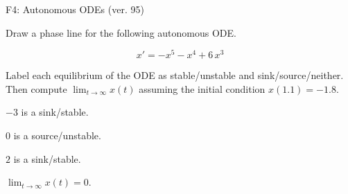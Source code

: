 \begin{exercise}
  \begin{exerciseTitle}F4: Autonomous ODEs (ver. 95)\end{exerciseTitle}
  \begin{exerciseStatement}
    

      Draw a phase line for the following 
      autonomous ODE.
    

    
\[x'= -x^{5} - x^{4} + 6 \, x^{3}\]

    

      Label each equilibrium of the ODE
      as stable/unstable and sink/source/neither.
      Then compute \(\lim_{t\to\infty}x(t)\)
      assuming the initial condition
      \(x( 1.1 )= -1.8\).
    

  \end{exerciseStatement}
  \begin{exerciseAnswer}
    

      \(-3\) is a sink/stable.
      
        \(0\) is a source/unstable.
      
      \(2\) is a sink/stable.
    

    

      \(\lim_{t\to\infty}x(t)=0\).
    

  \end{exerciseAnswer}
\end{exercise}